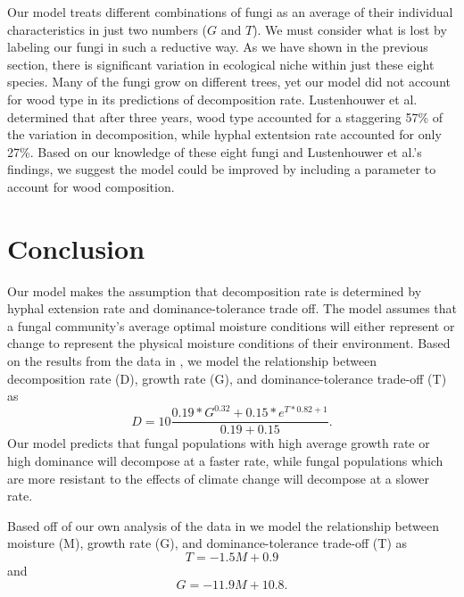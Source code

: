 \documentclass[12pt]{article}
\begin{document}
Our model treats different combinations of fungi as an average of their individual characteristics in just two numbers ($G$ and $T$). We must consider what is lost by labeling our fungi in such a reductive way. As we have shown in the previous section, there is significant variation in ecological niche within just these eight species. Many of the fungi grow on different trees, yet our model did not account for wood type in its predictions of decomposition rate. Lustenhouwer et al. determined that after three years, wood type accounted for a staggering 57\% of the variation in decomposition, while hyphal extentsion rate accounted for only 27\%. Based on our knowledge of these eight fungi and Lustenhouwer et al.'s findings, we suggest the model could be improved by including a parameter to account for wood composition. 


\section{Conclusion}

Our model makes the assumption that decomposition rate is determined by hyphal extension rate and dominance-tolerance trade off. The model assumes that a fungal community's average optimal moisture conditions will either represent or change to represent the physical moisture conditions of their environment. Based on the results from the data in \cite{lustenhouwer,source25}, we model the relationship between decomposition rate (D), growth rate (G), and dominance-tolerance trade-off (T) as 
\[
D = 10 \frac{0.19*G^{0.32} + 0.15 * e^{T*0.82+1}}{0.19+0.15}.
\]
Our model predicts that fungal populations with high average growth rate or high dominance will decompose at a faster rate, while fungal populations which are more resistant to the effects of climate change will decompose at a slower rate. 

Based off of our own analysis of the data in \cite{source25} we model the relationship between moisture (M), growth rate (G), and dominance-tolerance trade-off (T) as 
\[
T = -1.5 M + 0.9
\]
and 
\[
G = -11.9 M + 10.8.
\]
\end{document}
